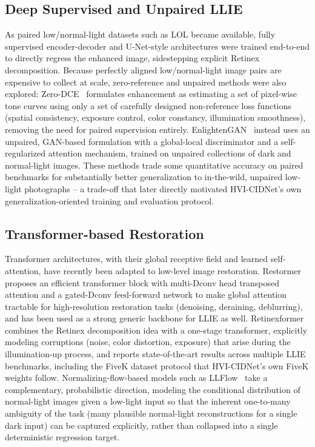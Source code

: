 \documentclass[conference]{IEEEtran}
\begin{document}
\subsection{Deep Supervised and Unpaired LLIE}
As paired low/normal-light datasets such as LOL became available, fully
supervised encoder-decoder and U-Net-style architectures were trained
end-to-end to directly regress the enhanced image, sidestepping explicit
Retinex decomposition. Because perfectly aligned low/normal-light image pairs
are expensive to collect at scale, zero-reference and unpaired methods were
also explored: Zero-DCE~\cite{guo2020zerodce} formulates enhancement as
estimating a set of pixel-wise tone curves using only a set of carefully
designed non-reference loss functions (spatial consistency, exposure control,
color constancy, illumination smoothness), removing the need for paired
supervision entirely. EnlightenGAN~\cite{jiang2021enlightengan} instead uses
an unpaired, GAN-based formulation with a global-local discriminator and a
self-regularized attention mechanism, trained on unpaired collections of dark
and normal-light images. These methods trade some quantitative accuracy on
paired benchmarks for substantially better generalization to in-the-wild,
unpaired low-light photographs -- a trade-off that later directly motivated
HVI-CIDNet's own generalization-oriented training and evaluation protocol.

\subsection{Transformer-based Restoration}
Transformer architectures, with their global receptive field and learned
self-attention, have recently been adapted to low-level image restoration.
Restormer~\cite{zamir2022restormer} proposes an efficient transformer block
with multi-Dconv head transposed attention and a gated-Dconv feed-forward
network to make global attention tractable for high-resolution restoration
tasks (denoising, deraining, deblurring), and has been used as a strong
generic backbone for LLIE as well. Retinexformer~\cite{cai2023retinexformer}
combines the Retinex decomposition idea with a one-stage transformer,
explicitly modeling corruptions (noise, color distortion, exposure) that
arise during the illumination-up process, and reports state-of-the-art
results across multiple LLIE benchmarks, including the FiveK dataset protocol
that HVI-CIDNet's own FiveK weights follow. Normalizing-flow-based models such
as LLFlow~\cite{wang2022llflow} take a complementary, probabilistic
direction, modeling the conditional distribution of normal-light images given
a low-light input so that the inherent one-to-many ambiguity of the task
(many plausible normal-light reconstructions for a single dark input) can be
captured explicitly, rather than collapsed into a single deterministic
regression target.
\end{document}
